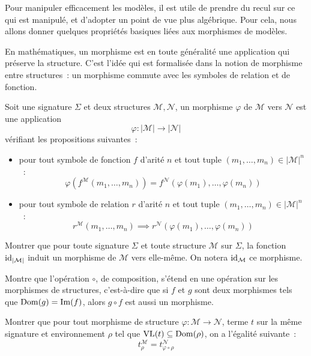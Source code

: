 Pour manipuler efficacement les modèles, il est utile de prendre du recul sur ce
qui est manipulé, et d'adopter un point de vue plus algébrique. Pour cela, nous
allons donner quelques propriétés basiques liées aux morphismes de modèles.

En mathématiques, un morphisme est en toute généralité une application qui
préserve la structure. C'est l'idée qui est formalisée dans la notion de
morphisme entre structures~: un morphisme commute avec les symboles de relation
et de fonction.

\begin{definition}
  Soit une signature $\Sigma$ et deux structures $\mathcal M,\mathcal N$, un
  morphisme $\varphi$ de $\mathcal M$ vers $\mathcal N$ est une application
  \[\varphi : |\mathcal M|\longrightarrow |\mathcal N|\]
  vérifiant les propositions suivantes~:
  \begin{itemize}
  \item pour tout symbole de fonction $f$ d'arité $n$ et tout tuple
    $(m_1,\ldots,m_n)\in|\mathcal M|^n$~:
    \[\varphi(f^{\mathcal M}(m_1,\ldots,m_n))
    = f^{\mathcal N}(\varphi(m_1),\ldots,\varphi(m_n))\]
  \item pour tout symbole de relation $r$ d'arité $n$ et tout tuple
    $(m_1,\ldots,m_n)\in|\mathcal M|^n$~:
    \[r^{\mathcal M}(m_1,\ldots,m_n) \implies
    r^{\mathcal N}(\varphi(m_1),\ldots,\varphi(m_n)) \]
  \end{itemize}
\end{definition}

\begin{exercise}
  Montrer que pour toute signature $\Sigma$ et toute structure $\mathcal M$ sur
  $\Sigma$, la fonction $\operatorname{id}_{|\mathcal M|}$ induit un morphisme de $\mathcal M$
  vers elle-même. On notera $\operatorname{id}_\mathcal M$ ce morphisme.
\end{exercise}

\begin{exercise}
  Montre que l'opération $\circ$, de composition, s'étend en une opération sur
  les morphismes de structures, c'est-à-dire que si $f$ et $g$ sont deux
  morphismes tels que $\operatorname{Dom}(g) = \operatorname{Im}(f)$, alors $g\circ f$ est aussi un
  morphisme.
\end{exercise}

\begin{exercise}\label{pred.exo.morph.val}
  Montrer que pour tout morphisme de structure
  $\varphi : \mathcal M \to \mathcal N$, terme $t$ sur la même signature et
  environnement $\rho$ tel que $\operatorname{VL}(t) \subseteq \operatorname{Dom}(\rho)$, on a l'égalité
  suivante~:
  \[t_\rho^\mathcal M = t_{\varphi\circ\rho}^\mathcal N\]
\end{exercise}

